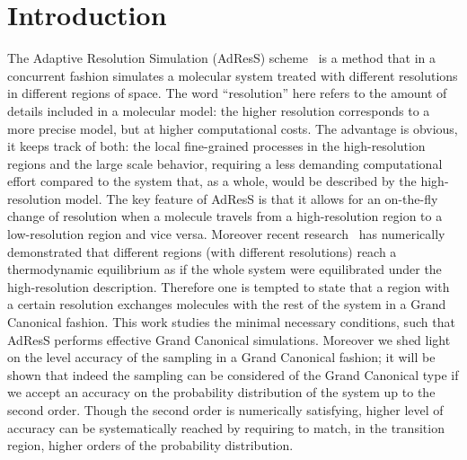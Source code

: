 \documentclass[aip,jcp,a4paper,reprint,onecolumn]{revtex4-1}
\begin{document}
\section{Introduction}
The Adaptive Resolution Simulation (AdResS) scheme~\cite{jcp,pre} is a
method that in a concurrent fashion simulates a molecular system treated with different
resolutions in different regions of space.  The word ``resolution''
here refers to the amount of details included in a molecular model: the higher 
resolution corresponds to a more precise model, but at higher computational costs. The advantage is obvious, it
keeps track of both: the local fine-grained processes in the
high-resolution regions and the large scale behavior, requiring a less demanding computational effort compared to the system that, as a
whole, would be described by the high-resolution model. The key feature of
AdResS is that it allows for an on-the-fly change of resolution when a
molecule travels from a high-resolution region to a low-resolution
region and vice versa. Moreover recent research~\cite{prlgc, rdfcorr}
has numerically demonstrated that different regions (with different resolutions) reach a
thermodynamic equilibrium as if the whole system were equilibrated
under the high-resolution description. Therefore one is tempted to state that a region with a
certain resolution exchanges molecules with the rest of the system in
a Grand Canonical fashion. This work
studies the minimal necessary conditions, such that AdResS
performs effective Grand Canonical simulations.  
Moreover we shed light on the level accuracy of
the sampling in a Grand Canonical fashion; it will be shown that indeed the sampling can be considered 
of the Grand Canonical type if we accept an accuracy on the probability distribution of the system up to the second order.
Though the second order is numerically satisfying, higher level of accuracy can be systematically reached by requiring to match, in the transition region, higher orders of the probability distribution.
\end{document}
